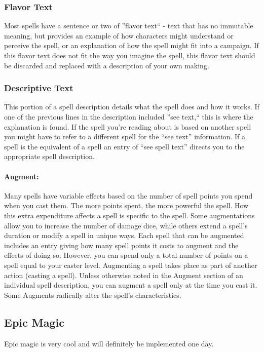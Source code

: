\subsubsection{Flavor Text}
Most spells have a sentence or two of ''flavor text`` - text that has no immutable meaning, but provides an example of how characters might understand or perceive the spell, or an explanation of how the spell might fit into a campaign.
If this flavor text does not fit the way you imagine the spell, this flavor text should be discarded and replaced with a description of your own making.

\subsubsection{Descriptive Text}
This portion of a spell description details what the spell does and how it works. If one of the previous lines in the description included ''see text,`` this is where the explanation is found. If the spell you're reading about is based on another spell you might have to refer to a different spell for the “see text” information. If a spell is the equivalent of a spell an entry of “see spell text” directs you to the appropriate spell description.

\paragraph[Augment]{Augment:} 
\label{sec:Augment}
Many spells have variable effects based on the number of spell points you spend when you cast them. The more points spent, the more powerful the spell. How this extra expenditure affects a spell is specific to the spell. Some augmentations allow you to increase the number of damage dice, while others extend a spell's duration or modify a spell in unique ways. Each spell that can be augmented includes an entry giving how many spell points it costs to augment and the effects of doing so. However, you can spend only a total number of points on a spell equal to your caster level.
Augmenting a spell takes place as part of another action (casting a spell). Unless otherwise noted in the Augment section of an individual spell description, you can augment a spell only at the time you cast it. Some Augments radically alter the spell's characteristics.
\subsection{Epic Magic}
Epic magic is very cool and will definitely be implemented one day.